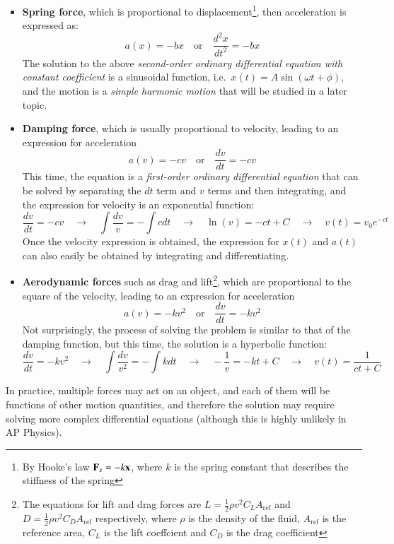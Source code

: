 \documentclass{../../oss-handout}
\newcommand{\mb}[1]{\ensuremath\mathbf{#1}}
\begin{document}
\begin{itemize}[leftmargin=15pt]
\item\textbf{Spring force}, which is proportional to displacement\footnote{By
  Hooke's law $\mb{F}_s=-k\mb{x}$, where $k$ is the spring constant that
  describes the stiffness of the spring}, then acceleration is expressed as:
  \begin{equation*}
    a(x)=-bx\quad\text{or}\quad \frac{d^2x}{dt^2}=-bx
  \end{equation*}
  The solution to the above \emph{second-order ordinary differential equation
    with constant coefficient} is a sinusoidal function, i.e.\
  $x(t)=A\sin(\omega t+\phi)$, and the motion is a \emph{simple harmonic
    motion} that will be studied in a later topic.
\item\textbf{Damping force}, which is usually proportional to velocity, leading
  to an expression for acceleration
  \begin{equation*}
    a(v)=-cv\quad\text{or}\quad \frac{dv}{dt}=-cv
  \end{equation*}
  This time, the equation is a \emph{first-order ordinary differential equation}
  that can be solved by separating the $dt$ term and $v$ terms and then
  integrating, and the expression for velocity is an exponential function:
  \begin{equation*}
    \frac{dv}{dt}=-cv\quad\rightarrow\quad \int\frac{dv}{v}=-\int cdt
    \quad\rightarrow\quad \ln(v)=-ct+C
    \quad\rightarrow\quad v(t)=v_0e^{-ct}
  \end{equation*}
  Once the velocity expression is obtained, the expression for $x(t)$ and
  $a(t)$ can also easily be obtained by integrating and differentiating.
\item\textbf{Aerodynamic forces} such as drag and lift\footnote{The equations
  for lift and drag forces are $L=\frac12\rho v^2C_LA_\mathrm{ref}$ and
  $D=\frac12\rho v^2C_DA_\mathrm{ref}$ respectively, where $\rho$ is the density
  of the fluid, $A_\mathrm{ref}$ is the reference area, $C_L$ is the lift
  coeffcient and $C_D$ is the drag coefficient}, which are proportional
  to the square of the velocity, leading to an expression for acceleration 
  \begin{equation*}
    a(v)=-kv^2\quad\text{or}\quad \frac{dv}{dt}=-kv^2
  \end{equation*}
  Not surprisingly, the process of solving the problem is similar to that of
  the damping function, but this time, the solution is a hyperbolic function:
  \begin{equation*}
    \frac{dv}{dt}=-kv^2\quad\rightarrow\quad \int\frac{dv}{v^2}=-\int kdt
    \quad\rightarrow\quad -\frac{1}{v}=-kt+C
    \quad\rightarrow\quad v(t)=\frac{1}{ct+C}
  \end{equation*}
\end{itemize}
In practice, multiple forces may act on an object, and each of them will be
functions of other motion quantities, and therefore the solution may require
solving more complex differential equations (although this is highly unlikely in
AP Physics).
\end{document}
